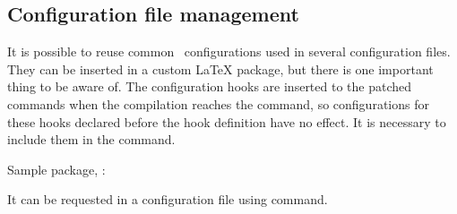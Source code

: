 
\subsection{Configuration file management}

It is possible to reuse common \texfourht\ configurations used in several
configuration files.  They can be inserted in a custom LaTeX package, but there
is one important thing to be aware of. The configuration hooks are inserted to
the patched commands when the compilation reaches the  
\texcommand{} command, so configurations for these hooks
declared before the hook definition have no effect. It is necessary to include
them in the \texcommand{\AtBeginDocument} command.

Sample package, :


It can be requested in a configuration file using \texcommand{\RequirePackage} command.

\begin{texsource}
\RequirePackage{commonconfigurations}

\EndPreamble
\end{texsource}


